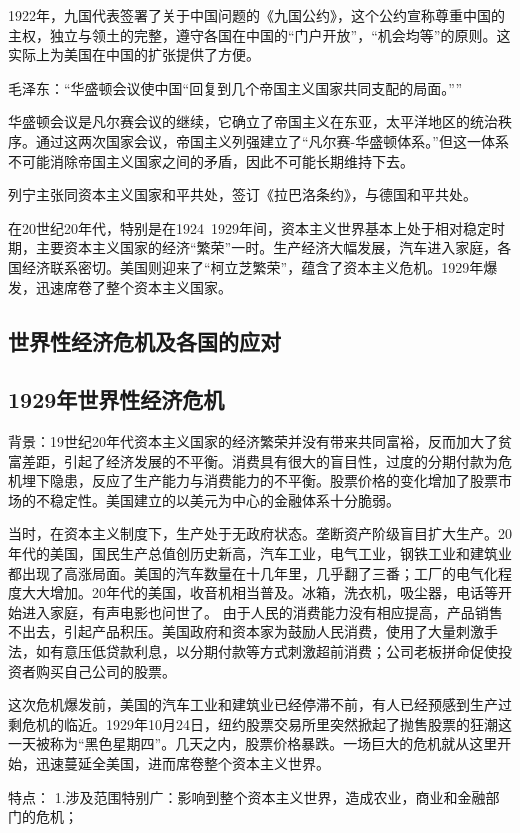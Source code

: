 1922年，九国代表签署了关于中国问题的《九国公约》，这个公约宣称尊重中国的主权，独立与领土的完整，遵守各国在中国的“门户开放”，“机会均等”的原则。这实际上为美国在中国的扩张提供了方便。

毛泽东：“华盛顿会议使中国“回复到几个帝国主义国家共同支配的局面。””

华盛顿会议是凡尔赛会议的继续，它确立了帝国主义在东亚，太平洋地区的统治秩序。通过这两次国家会议，帝国主义列强建立了“凡尔赛-华盛顿体系。”但这一体系不可能消除帝国主义国家之间的矛盾，因此不可能长期维持下去。

列宁主张同资本主义国家和平共处，签订《拉巴洛条约》，与德国和平共处。

在20世纪20年代，特别是在1924~1929年间，资本主义世界基本上处于相对稳定时期，主要资本主义国家的经济“繁荣”一时。生产经济大幅发展，汽车进入家庭，各国经济联系密切。美国则迎来了“柯立芝繁荣”，蕴含了资本主义危机。1929年爆发，迅速席卷了整个资本主义国家。


\subsection{世界性经济危机及各国的应对}
\subsection{1929年世界性经济危机}
背景：19世纪20年代资本主义国家的经济繁荣并没有带来共同富裕，反而加大了贫富差距，引起了经济发展的不平衡。消费具有很大的盲目性，过度的分期付款为危机埋下隐患，反应了生产能力与消费能力的不平衡。股票价格的变化增加了股票市场的不稳定性。美国建立的以美元为中心的金融体系十分脆弱。

当时，在资本主义制度下，生产处于无政府状态。垄断资产阶级盲目扩大生产。20年代的美国，国民生产总值创历史新高，汽车工业，电气工业，钢铁工业和建筑业都出现了高涨局面。美国的汽车数量在十几年里，几乎翻了三番；工厂的电气化程度大大增加。20年代的美国，收音机相当普及。冰箱，洗衣机，吸尘器，电话等开始进入家庭，有声电影也问世了。
由于人民的消费能力没有相应提高，产品销售不出去，引起产品积压。美国政府和资本家为鼓励人民消费，使用了大量刺激手法，如有意压低贷款利息，以分期付款等方式刺激超前消费；公司老板拼命促使投资者购买自己公司的股票。

这次危机爆发前，美国的汽车工业和建筑业已经停滞不前，有人已经预感到生产过剩危机的临近。1929年10月24日，纽约股票交易所里突然掀起了抛售股票的狂潮这一天被称为“黑色星期四”。几天之内，股票价格暴跌。一场巨大的危机就从这里开始，迅速蔓延全美国，进而席卷整个资本主义世界。

特点：
1.涉及范围特别广：影响到整个资本主义世界，造成农业，商业和金融部门的危机；

